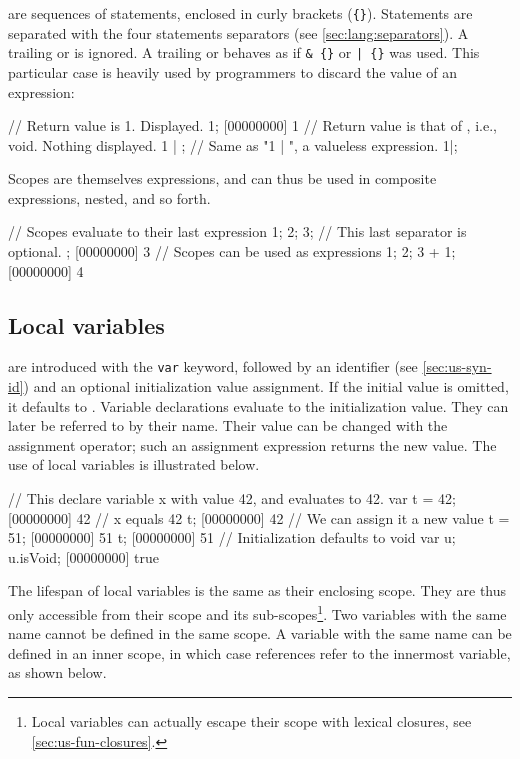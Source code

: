  are sequences of statements, enclosed in curly brackets
(\lstinline|{}|). Statements are separated with the four statements
separators (see \autoref{sec:lang:separators}).  A trailing \samp{;}
or \samp{,} is ignored.  A trailing \samp{\&} or \samp{|} behaves as
if \lstinline|& {}| or \lstinline'| {}' was used.  This particular
case is heavily used by \us programmers to discard the value of an
expression:

\begin{urbiscript}
// Return value is 1.  Displayed.
1;
[00000000] 1
// Return value is that of {}, i.e., void.  Nothing displayed.
1 | {};
// Same as "1 | {}", a valueless expression.
1|;
\end{urbiscript}

Scopes are themselves expressions, and can thus be used in composite
expressions, nested, and so forth.

\begin{urbiscript}
// Scopes evaluate to their last expression
{
  1;
  2;
  3; // This last separator is optional.
};
[00000000] 3
// Scopes can be used as expressions
{1; 2; 3} + 1;
[00000000] 4
\end{urbiscript}

\subsection{Local variables}

 are introduced with the \lstinline|var| keyword,
followed by an identifier (see \autoref{sec:us-syn-id}) and an optional
initialization value assignment. If the initial value is omitted, it
defaults to . Variable
declarations evaluate to
the initialization value. They can later be referred to by their
name. Their value can be changed with the assignment operator; such an
assignment expression returns the new value. The use of local
variables is illustrated below.

\begin{urbiscript}
// This declare variable x with value 42, and evaluates to 42.
var t = 42;
[00000000] 42
// x equals 42
t;
[00000000] 42
// We can assign it a new value
t = 51;
[00000000] 51
t;
[00000000] 51
// Initialization defaults to void
var u;
u.isVoid;
[00000000] true
\end{urbiscript}

The lifespan of local variables is the same as their enclosing scope. They
are thus only accessible from their scope and its
sub-scopes\footnote{Local variables can actually escape their scope
  with lexical closures, see \autoref{sec:us-fun-closures}.}. Two
variables with the same name cannot be defined in the same scope. A
variable with the same name can be defined in an inner scope, in which
case references refer to the innermost variable, as shown below.

